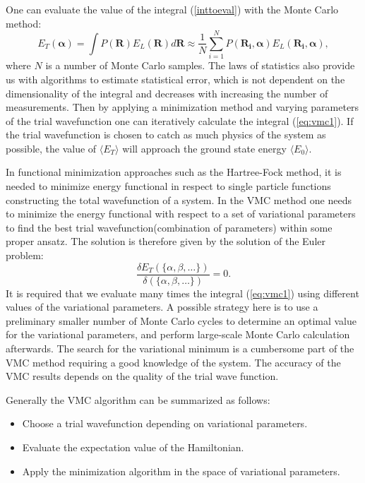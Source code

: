 \documentclass[twoside,english]{uiofysmaster}
\begin{document}
One can evaluate the value of the integral (\ref{inttoeval}) with the Monte Carlo method: 
\begin{equation}\label{eq:vmc1}
E_T(\boldsymbol{\alpha})=\int P(\boldsymbol{R})E_L(\boldsymbol{R}) d\boldsymbol{R}\approx \frac{1}{N}\sum_{i=1}^NP(\boldsymbol{R_i},\boldsymbol{\alpha})E_L(\boldsymbol{R_i},\boldsymbol{\alpha}),
\end{equation}
where $N$ is a number of Monte Carlo samples. The laws of statistics
also provide us with algorithms to estimate statistical error, which
is not dependent on the dimensionality of the integral and decreases
with increasing the number of measurements.  Then by applying a
minimization method and varying parameters of the trial wavefunction
one can iteratively calculate the integral (\ref{eq:vmc1}). If the trial
wavefunction is chosen to catch as much physics of the system as
possible, the  value of $\langle E_T \rangle$ will approach the ground state
energy $\langle E_0 \rangle$.

In functional minimization approaches such as the Hartree-Fock method,
it is needed to minimize energy functional in respect to single
particle functions constructing the total wavefunction of a system. In
the VMC method one needs to minimize the energy functional with  respect to a
set of variational parameters to find the best trial
wavefunction(combination of parameters) within some proper ansatz. The
solution is therefore given by the solution of the Euler problem:
\begin{equation}
\frac{\delta E_T(\{\alpha, \beta, \dots\})}{\delta(\{\alpha, \beta, \dots\})} = 0.
\end{equation}
It is required that we evaluate many times the integral
(\ref{eq:vmc1}) using different values of the variational
parameters. A possible strategy here is to use a preliminary smaller number of
Monte Carlo cycles to determine an optimal value for the variational
parameters, and perform large-scale Monte Carlo calculation
afterwards. The search for the variational minimum is a
cumbersome part of the VMC method requiring a good knowledge of the
system. The accuracy of the VMC results depends on the
quality of the trial wave function.

Generally the VMC algorithm can be summarized as follows:

\begin{itemize}
	\item Choose a trial wavefunction depending on variational parameters.
	\item Evaluate the expectation value of the Hamiltonian.
	\item Apply the minimization algorithm in the space of variational parameters.
\end{itemize} 
\end{document}
